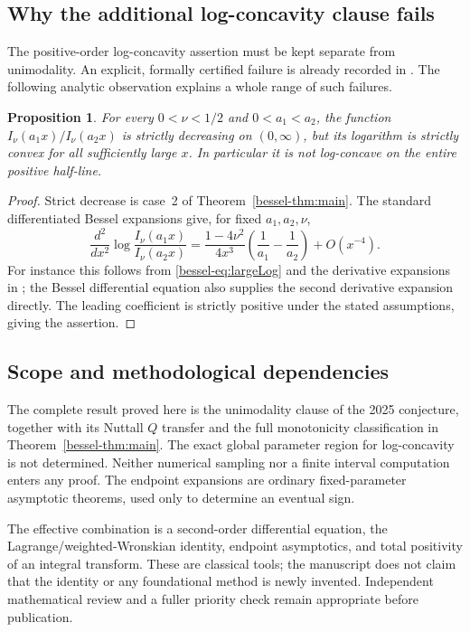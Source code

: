 \documentclass[11pt,a4paper]{article}
\newtheorem{proposition}[theorem]{Proposition}
\theoremstyle{remark}\newtheorem{remark}[theorem]{Remark}
\numberwithin{equation}{section}
\begin{document}
\subsection{Why the additional log-concavity clause fails}
The positive-order log-concavity assertion must be kept separate from
unimodality. An explicit, formally certified failure is already
recorded in \cite{bessel-TT}. The following analytic observation explains
a whole range of such failures.

\begin{proposition}\label{bessel-prop:lc}
For every $0<\nu<1/2$ and $0<a_1<a_2$, the function
$I_\nu(a_1x)/I_\nu(a_2x)$ is strictly decreasing on $(0,\infty)$,
but its logarithm is strictly convex for all sufficiently large $x$.
In particular it is not log-concave on the entire positive half-line.
\end{proposition}
\begin{proof}
Strict decrease is case~2 of Theorem~\ref{bessel-thm:main}.
The standard differentiated Bessel expansions give, for fixed
$a_1,a_2,\nu$,
\[
 \frac{d^2}{dx^2}\log\frac{I_\nu(a_1x)}{I_\nu(a_2x)}
 =\frac{1-4\nu^2}{4x^3}
    \left(\frac1{a_1}-\frac1{a_2}\right)+O(x^{-4}).
\]
For instance this follows from \eqref{bessel-eq:largeLog} and the derivative
expansions in \cite[\S10.40(i)]{bessel-DLMF}; the Bessel differential equation
also supplies the second derivative expansion directly.
The leading coefficient is strictly positive under the stated
assumptions, giving the assertion.
\end{proof}

\subsection{Scope and methodological dependencies}
The complete result proved here is the unimodality clause of the
2025 conjecture, together with its Nuttall $Q$ transfer and the full
monotonicity classification in Theorem~\ref{bessel-thm:main}.
The exact global parameter region for log-concavity is not determined.
Neither numerical sampling nor a finite interval computation enters
any proof. The endpoint expansions are ordinary fixed-parameter
asymptotic theorems, used only to determine an eventual sign.

The effective combination is a second-order differential equation,
the Lagrange/weighted-Wronskian identity, endpoint asymptotics, and
total positivity of an integral transform. These are classical tools;
the manuscript does not claim that the identity or any foundational
method is newly invented. Independent mathematical
review and a fuller priority check remain appropriate before publication.
\end{document}
